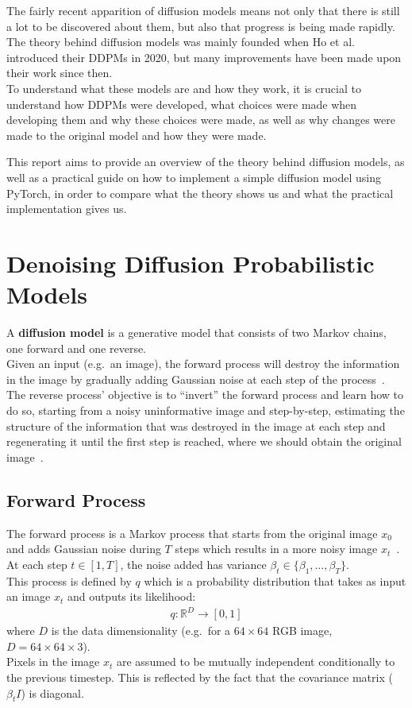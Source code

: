 \documentclass{article}
\numberwithin{equation}{section}
\numberwithin{figure}{section}
\begin{document}
The fairly recent apparition of diffusion models means not only that there is still a lot to be discovered about them, but also that progress is being made rapidly.
The theory behind diffusion models was mainly founded when Ho et al.~\citep{ho2020denoising} introduced their DDPMs in 2020, but many improvements have been made upon their work since then. \\ 
To understand what these models are and how they work, it is crucial to understand how DDPMs were developed, what choices were made when developing them and why these choices were made, as well as why changes were made to the original model and how they were made.

This report aims to provide an overview of the theory behind diffusion models, as well as a practical guide on how to implement a simple diffusion model using PyTorch, in order to compare what the theory shows us and what the practical implementation gives us.


\newpage
\section{Denoising Diffusion Probabilistic Models}
A \textbf{diffusion model} is a generative model that consists of two Markov chains, one forward and one reverse. \\
Given an input (e.g.\ an image), the forward process will destroy the information in the image by gradually adding Gaussian noise at each step of the process~\cite{ho2020denoising}. \\
The reverse process' objective is to ``invert'' the forward process and learn how to do so, starting from a noisy uninformative image and step-by-step, estimating the structure of the information that was destroyed in the image at each step and regenerating it until the first step is reached, where we should obtain the original image~\cite{ho2020denoising}.

\subsection{Forward Process}

The forward process is a Markov process that starts from the original image $x_0$ and adds Gaussian noise during $T$ steps which results in a more noisy image $x_t$~\cite{ho2020denoising}. \\
At each step $t \in \left[1, T\right]$, the noise added has variance $\beta_t \in \{ \beta_1, \dots, \beta_T \}$. \\ 
This process is defined by $q$ which is a probability distribution that takes as input an image $x_{t}$ and outputs its likelihood:
\begin{align}
  q: \mathbb{R}^D \rightarrow [0, 1]
\end{align}
where $D$ is the data dimensionality (e.g.\ for a $64 \times 64$ RGB image, $D = 64 \times 64 \times 3$). \\
Pixels in the image $x_t$ are assumed to be mutually independent conditionally to the previous timestep. This is reflected by the fact that the covariance matrix ($\beta_t I$) is diagonal.
\end{document}
